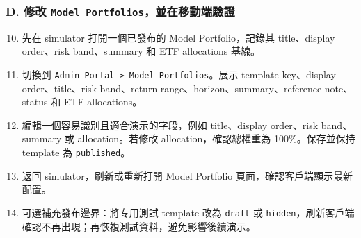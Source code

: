 \subsubsection{D. 修改 \texttt{Model Portfolios}，並在移動端驗證}
\begin{enumerate}
\setcounter{enumi}{9}
\item 先在 simulator 打開一個已發布的 Model Portfolio，記錄其 title、display order、risk band、summary 和 ETF allocations 基線。
\item 切換到 \texttt{Admin Portal \textgreater{} Model Portfolios}。展示 template key、display order、title、risk band、return range、horizon、summary、reference note、status 和 ETF allocations。
\item 編輯一個容易識別且適合演示的字段，例如 title、display order、risk band、summary 或 allocation。若修改 allocation，確認總權重為 100\%。保存並保持 template 為 \texttt{published}。
\item 返回 simulator，刷新或重新打開 Model Portfolio 頁面，確認客戶端顯示最新配置。
\item 可選補充發布邊界：將专用測試 template 改為 \texttt{draft} 或 \texttt{hidden}，刷新客戶端確認不再出現；再恢複測試資料，避免影響後續演示。
\end{enumerate}
